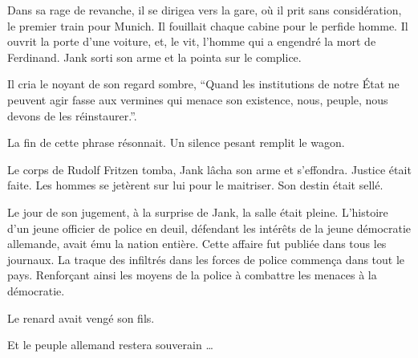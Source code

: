 Dans sa rage de revanche, il se dirigea vers la gare, où il prit sans considération, le premier train pour Munich.
Il fouillait chaque cabine pour le perfide homme.
Il ouvrit la porte d'une voiture, et, le vit, l'homme qui a engendré la mort de Ferdinand.
Jank sorti son arme et la pointa sur le complice.

Il cria le noyant de son regard sombre, \enquote{Quand les institutions de notre État ne peuvent agir fasse aux vermines qui menace son existence, nous, peuple, nous devons de les réinstaurer.}.

La fin de cette phrase résonnait.
Un silence pesant remplit le wagon.

Le corps de Rudolf Fritzen tomba, Jank lâcha son arme et s'effondra.
Justice était faite.
Les hommes se jetèrent sur lui pour le maitriser.
Son destin était sellé.

Le jour de son jugement, à la surprise de Jank, la salle était pleine.
L'histoire d'un jeune officier de police en deuil, défendant les intérêts de la jeune démocratie allemande, avait ému la nation entière. 
Cette affaire fut publiée dans tous les journaux.
La traque des infiltrés dans les forces de police commença dans tout le pays.
Renforçant ainsi les moyens de la police à combattre les menaces à la démocratie. 

Le renard avait vengé son fils.

Et le peuple allemand restera souverain \dots